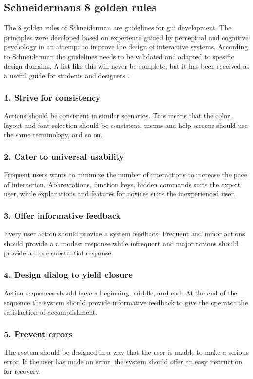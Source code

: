 \subsection{Schneidermans 8 golden rules}
\label{sec:schneiderman}
The 8 golden rules of Schneiderman are guidelines for \acrshort{gui} development. The principles were developed based on experience gained by perceptual and cognitive psychology in an attempt to improve the design of interactive systems. According to Schneiderman the guidelines needs to be validated and adapted to spesific design domains. A list like this will never be complete, but it has been received as a useful guide for students and designers \cite{schneiderman}.

\subsubsection{1. Strive for consistency}
Actions should be consistent in similar scenarios. This means that the color, layout and font selection should be consistent, menus and help screens should use the same terminology, and so on.

\subsubsection{2. Cater to universal usability}
Frequent users wants to minimize the number of interactions to increase the pace of interaction. Abbreviations, function keys, hidden commands suits the expert user, while explanations and features for novices suits the inexperienced user.

\subsubsection{3. Offer informative feedback}
Every user action should provide a system feedback. Frequent and minor actions should provide a a modest response while infrequent and major actions should provide a more substantial response.

\subsubsection{4. Design dialog to yield closure}
Action sequences should have a beginning, middle, and end. At the end of the sequence the system should provide informative feedback to give the operator the satisfaction of accomplishment.

\subsubsection{5. Prevent errors}
The system should be designed in a way that the user is unable to make a serious error. If the user has made an error, the system should offer an easy instruction for recovery.

